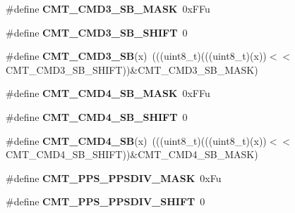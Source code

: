 \begin{DoxyCompactItemize}
\item 
\#define {\bfseries C\+M\+T\+\_\+\+C\+M\+D3\+\_\+\+S\+B\+\_\+\+M\+A\+SK}~0x\+F\+Fu\hypertarget{group__CMT__Register__Masks_ga0ee814da2957c935fad8b236d52b22f5}{}\label{group__CMT__Register__Masks_ga0ee814da2957c935fad8b236d52b22f5}

\item 
\#define {\bfseries C\+M\+T\+\_\+\+C\+M\+D3\+\_\+\+S\+B\+\_\+\+S\+H\+I\+FT}~0\hypertarget{group__CMT__Register__Masks_ga87210814a860e3ea66f06747156fbd9a}{}\label{group__CMT__Register__Masks_ga87210814a860e3ea66f06747156fbd9a}

\item 
\#define {\bfseries C\+M\+T\+\_\+\+C\+M\+D3\+\_\+\+SB}(x)~(((uint8\+\_\+t)(((uint8\+\_\+t)(x))$<$$<$C\+M\+T\+\_\+\+C\+M\+D3\+\_\+\+S\+B\+\_\+\+S\+H\+I\+FT))\&C\+M\+T\+\_\+\+C\+M\+D3\+\_\+\+S\+B\+\_\+\+M\+A\+SK)\hypertarget{group__CMT__Register__Masks_ga431d80d598dabe4e65e1afb9eb9db574}{}\label{group__CMT__Register__Masks_ga431d80d598dabe4e65e1afb9eb9db574}

\item 
\#define {\bfseries C\+M\+T\+\_\+\+C\+M\+D4\+\_\+\+S\+B\+\_\+\+M\+A\+SK}~0x\+F\+Fu\hypertarget{group__CMT__Register__Masks_ga634397e39fb458afba9c0cfefdfc36d8}{}\label{group__CMT__Register__Masks_ga634397e39fb458afba9c0cfefdfc36d8}

\item 
\#define {\bfseries C\+M\+T\+\_\+\+C\+M\+D4\+\_\+\+S\+B\+\_\+\+S\+H\+I\+FT}~0\hypertarget{group__CMT__Register__Masks_gac4d14f573bc993ac68f7cc9242fbe888}{}\label{group__CMT__Register__Masks_gac4d14f573bc993ac68f7cc9242fbe888}

\item 
\#define {\bfseries C\+M\+T\+\_\+\+C\+M\+D4\+\_\+\+SB}(x)~(((uint8\+\_\+t)(((uint8\+\_\+t)(x))$<$$<$C\+M\+T\+\_\+\+C\+M\+D4\+\_\+\+S\+B\+\_\+\+S\+H\+I\+FT))\&C\+M\+T\+\_\+\+C\+M\+D4\+\_\+\+S\+B\+\_\+\+M\+A\+SK)\hypertarget{group__CMT__Register__Masks_gab29afd8c13712224b175b9ea866463ba}{}\label{group__CMT__Register__Masks_gab29afd8c13712224b175b9ea866463ba}

\item 
\#define {\bfseries C\+M\+T\+\_\+\+P\+P\+S\+\_\+\+P\+P\+S\+D\+I\+V\+\_\+\+M\+A\+SK}~0x\+Fu\hypertarget{group__CMT__Register__Masks_ga52042920cc25a46d0e050801a105a629}{}\label{group__CMT__Register__Masks_ga52042920cc25a46d0e050801a105a629}

\item 
\#define {\bfseries C\+M\+T\+\_\+\+P\+P\+S\+\_\+\+P\+P\+S\+D\+I\+V\+\_\+\+S\+H\+I\+FT}~0\hypertarget{group__CMT__Register__Masks_gaaafd6c1e8178ed7cd283f3ffcfaed535}{}\label{group__CMT__Register__Masks_gaaafd6c1e8178ed7cd283f3ffcfaed535}


\end{DoxyCompactItemize}
